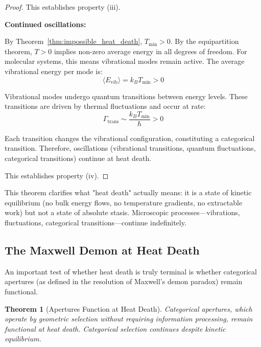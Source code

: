 \documentclass[12pt,a4paper]{article}
\newtheorem{theorem}{Theorem}[section]
\theoremstyle{definition}
\theoremstyle{remark}
\begin{document}
\begin{proof}
This establishes property (iii).

\textbf{Continued oscillations:}

By Theorem~\ref{thm:impossible_heat_death}, $T_{\min} > 0$. By the equipartition theorem, $T > 0$ implies non-zero average energy in all degrees of freedom. For molecular systems, this means vibrational modes remain active. The average vibrational energy per mode is:
\begin{equation}
\langle E_{\text{vib}} \rangle = k_B T_{\min} > 0
\end{equation}

Vibrational modes undergo quantum transitions between energy levels. These transitions are driven by thermal fluctuations and occur at rate:
\begin{equation}
\Gamma_{\text{trans}} \sim \frac{k_B T_{\min}}{\hbar} > 0
\end{equation}

Each transition changes the vibrational configuration, constituting a categorical transition. Therefore, oscillations (vibrational transitions, quantum fluctuations, categorical transitions) continue at heat death.

This establishes property (iv).
\end{proof}

This theorem clarifies what "heat death" actually means: it is a state of kinetic equilibrium (no bulk energy flows, no temperature gradients, no extractable work) but not a state of absolute stasis. Microscopic processes—vibrations, fluctuations, categorical transitions—continue indefinitely.

\subsection{The Maxwell Demon at Heat Death}

An important test of whether heat death is truly terminal is whether categorical apertures (as defined in the resolution of Maxwell's demon paradox) remain functional.

\begin{theorem}[Apertures Function at Heat Death]
\label{thm:apertures_heat_death}
Categorical apertures, which operate by geometric selection without requiring information processing, remain functional at heat death. Categorical selection continues despite kinetic equilibrium.
\end{theorem}
\end{document}
